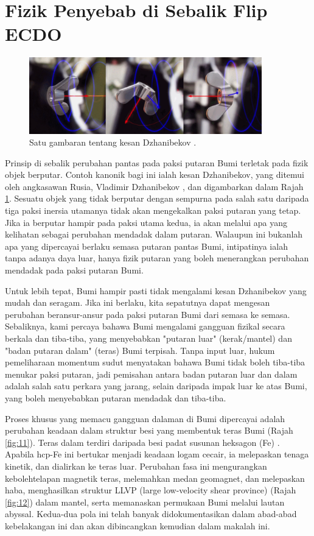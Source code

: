 \documentclass[10pt,twocolumn,letterpaper]{article}
\begin{document}
\section{Fizik Penyebab di Sebalik Flip ECDO}
\begin{figure}
\begin{center}
\includegraphics[width=0.9\textwidth]{dzhani.jpg}
\end{center}
   \caption{Satu gambaran tentang kesan Dzhanibekov \cite{28}.}
\label{fig:10}
\end{figure}

Prinsip di sebalik perubahan pantas pada paksi putaran Bumi terletak pada fizik objek berputar. Contoh kanonik bagi ini ialah kesan Dzhanibekov, yang ditemui oleh angkasawan Rusia, Vladimir Dzhanibekov \cite{37}, dan digambarkan dalam Rajah \ref{fig:10}. Sesuatu objek yang tidak berputar dengan sempurna pada salah satu daripada tiga paksi inersia utamanya tidak akan mengekalkan paksi putaran yang tetap. Jika ia berputar hampir pada paksi utama kedua, ia akan melalui apa yang kelihatan sebagai perubahan mendadak dalam putaran. Walaupun ini bukanlah apa yang dipercayai berlaku semasa putaran pantas Bumi, intipatinya ialah tanpa adanya daya luar, hanya fizik putaran yang boleh menerangkan perubahan mendadak pada paksi putaran Bumi.

Untuk lebih tepat, Bumi hampir pasti tidak mengalami kesan Dzhanibekov yang mudah dan seragam. Jika ini berlaku, kita sepatutnya dapat mengesan perubahan beransur-ansur pada paksi putaran Bumi dari semasa ke semasa. Sebaliknya, kami percaya bahawa Bumi mengalami gangguan fizikal secara berkala dan tiba-tiba, yang menyebabkan "putaran luar" (kerak/mantel) dan "badan putaran dalam" (teras) Bumi terpisah. Tanpa input luar, hukum pemeliharaan momentum sudut menyatakan bahawa Bumi tidak boleh tiba-tiba menukar paksi putaran, jadi pemisahan antara badan putaran luar dan dalam adalah salah satu perkara yang jarang, selain daripada impak luar ke atas Bumi, yang boleh menyebabkan putaran mendadak dan tiba-tiba.

Proses khusus yang memacu gangguan dalaman di Bumi dipercayai adalah perubahan keadaan dalam struktur besi yang membentuk teras Bumi (Rajah \ref{fig:11}). Teras dalam terdiri daripada besi padat susunan heksagon (Fe) \cite{141}. Apabila hcp-Fe ini bertukar menjadi keadaan logam cecair, ia melepaskan tenaga kinetik, dan dialirkan ke teras luar. Perubahan fasa ini mengurangkan kebolehtelapan magnetik teras, melemahkan medan geomagnet, dan melepaskan haba, menghasilkan struktur LLVP (large low-velocity shear province) (Rajah \ref{fig:12}) \cite{38} dalam mantel, serta memanaskan permukaan Bumi melalui lautan abyssal. Kedua-dua pola ini telah banyak didokumentasikan dalam abad-abad kebelakangan ini dan akan dibincangkan kemudian dalam makalah ini.
\end{document}
